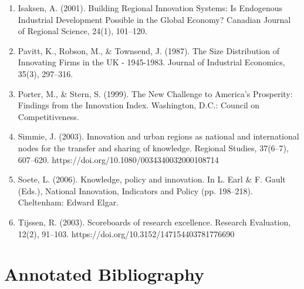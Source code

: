 \documentclass[a4paper,11pt]{article}
\begin{document}
\begin{enumerate}
\item Isaksen, A. (2001). Building Regional Innovation Systems: Is Endogenous Industrial Development Possible in the Global Economy? Canadian Journal of Regional Science, 24(1), 101–120.
\item Pavitt, K., Robson, M., \& Townsend, J. (1987). The Size Distribution of Innovating Firms in the UK - 1945-1983. Journal of Industrial Economics, 35(3), 297–316.
\item Porter, M., \& Stern, S. (1999). The New Challenge to America’s Prosperity: Findings from the Innovation Index. Washington, D.C.: Council on Competitiveness.
\item Simmie, J. (2003). Innovation and urban regions as national and international nodes for the transfer and sharing of knowledge. Regional Studies, 37(6–7), 607–620. https://doi.org/10.1080/0034340032000108714
\item Soete, L. (2006). Knowledge, policy and innovation. In L. Earl \& F. Gault (Eds.), National Innovation, Indicators and Policy (pp. 198–218). Cheltenham: Edward Elgar.
\item Tijssen, R. (2003). Scoreboards of research excellence. Research Evaluation, 12(2), 91–103. https://doi.org/10.3152/147154403781776690
\end{enumerate}

\section{Annotated Bibliography \label{annotated_bib}}
\label{sec:org8457eae}




\end{document}
